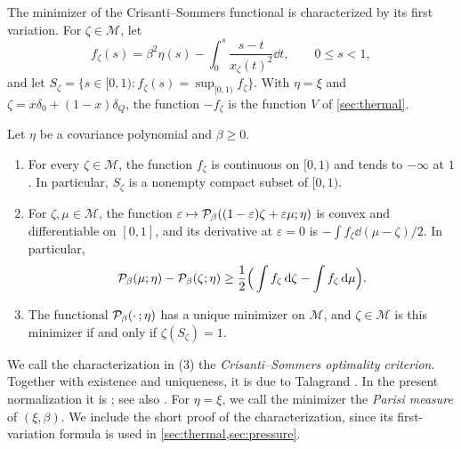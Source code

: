 The minimizer of the Crisanti--Sommers functional is characterized by its first variation. For $\zeta\in\mathscr M$, let
\begin{equation}\label{eq:pre-first-variation}
f_\zeta(s)=\beta^2\eta(s)-\int_0^s\frac{s-t}{\hat x_\zeta(t)^2}\dd t,\qquad 0\le s<1,
\end{equation}
and let $S_\zeta=\{s\in[0,1):f_\zeta(s)=\sup_{[0,1)}f_\zeta\}$. With $\eta=\xi$ and $\zeta=x\delta_0+(1-x)\delta_Q$, the function $-f_\zeta$ is the function $V$ of \cref{sec:thermal}.

\begin{lemma}\label{lem:pre-support}
Let $\eta$ be a covariance polynomial and $\beta\ge0$.
\begin{enumerate}
\item For every $\zeta\in\mathscr M$, the function $f_\zeta$ is continuous on $[0,1)$ and tends to $-\infty$ at $1$. In particular, $S_\zeta$ is a nonempty compact subset of $[0,1)$.
\item For $\zeta,\mu\in\mathscr M$, the function $\varepsilon\mapsto\mathcal P_\beta((1-\varepsilon)\zeta+\varepsilon\mu;\eta)$ is convex and differentiable on $[0,1]$, and its derivative at $\varepsilon=0$ is $-\int f_\zeta\dd(\mu-\zeta)/2$. In particular,
\begin{equation}\label{eq:pre-variation-inequality}
\mathcal P_\beta(\mu;\eta)-\mathcal P_\beta(\zeta;\eta)\ge\frac12\Big(\int f_\zeta\,\mathrm d\zeta-\int f_\zeta\,\mathrm d\mu\Big).
\end{equation}
\item The functional $\mathcal P_\beta(\cdot\,;\eta)$ has a unique minimizer on $\mathscr M$, and $\zeta\in\mathscr M$ is this minimizer if and only if $\zeta(S_\zeta)=1$.
\end{enumerate}
\end{lemma}

We call the characterization in (3) the \emph{Crisanti--Sommers optimality criterion}. Together with existence and uniqueness, it is due to Talagrand \cite[Proposition~2.1]{Talagrand2006}. In the present normalization it is \cite[Lemma~1.2]{HuangSellke2024}; see also \cite[Proposition~9]{Subag2024}. For $\eta=\xi$, we call the minimizer the \emph{Parisi measure} of $(\xi,\beta)$. We include the short proof of the characterization, since its first-variation formula is used in \cref{sec:thermal,sec:pressure}.

